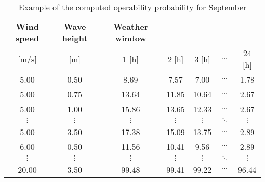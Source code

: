 \begin{table}
\label{tab:proba}
\begin{tabular}{ccccccc}
\hline
{\bf Wind speed} & {\bf Wave height} & {\bf Weather window} &            &            &            &            \\

     [m/s]      &      [m]      &          1 [h] &          2 [h] &          3 [h] &  $\cdots$ &         24 [h] \\
\hline
      5.00 &       0.50 &       8.69 &       7.57 &       7.00 &  $\cdots$ &       1.78 \\

      5.00 &       0.75 &      13.64 &      11.85 &      10.64 &  $\cdots$ &       2.67 \\

      5.00 &       1.00 &      15.86 &      13.65 &      12.33 &  $\cdots$ &       2.67 \\

 $\vdots$ &  $\vdots$ &  $\vdots$ &  $\vdots$ &  $\vdots$ &  $\ddots$ &  $\vdots$ \\

      5.00 &       3.50 &      17.38 &      15.09 &      13.75 &  $\cdots$ &       2.89 \\

      6.00 &       0.50 &      11.56 &      10.41 &       9.56 &  $\cdots$ &       2.89 \\

 $\vdots$ &  $\vdots$ &  $\vdots$ &  $\vdots$ &  $\vdots$ & $\ddots$           &  $\vdots$ \\

     20.00 &       3.50 &      99.48 &      99.41 &      99.22 &  $\cdots$ &      96.44 \\
\hline
\end{tabular}  

\caption{Example of the computed operability probability for September}
\end{table}